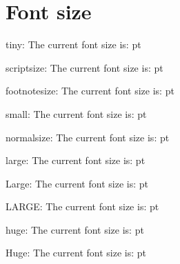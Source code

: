 \documentclass{ltjarticle}
\makeatletter
\newcommand\thefontsize[1]{#1 The current font size is: \f@size pt\par}
\makeatother
\begin{document}

\clearpage
\section{Font size}
tiny: \thefontsize{\tiny} \normalsize
scriptsize: \thefontsize{\scriptsize} \normalsize
footnotesize: \thefontsize{\footnotesize} \normalsize
small: \thefontsize{\small} \normalsize
normalsize: \thefontsize{\normalsize} \normalsize
large: \thefontsize{\large} \normalsize
Large: \thefontsize{\Large} \normalsize
LARGE: \thefontsize{\LARGE} \normalsize
huge: \thefontsize{\huge} \normalsize
Huge: \thefontsize{\Huge} \normalsize
\end{document}

